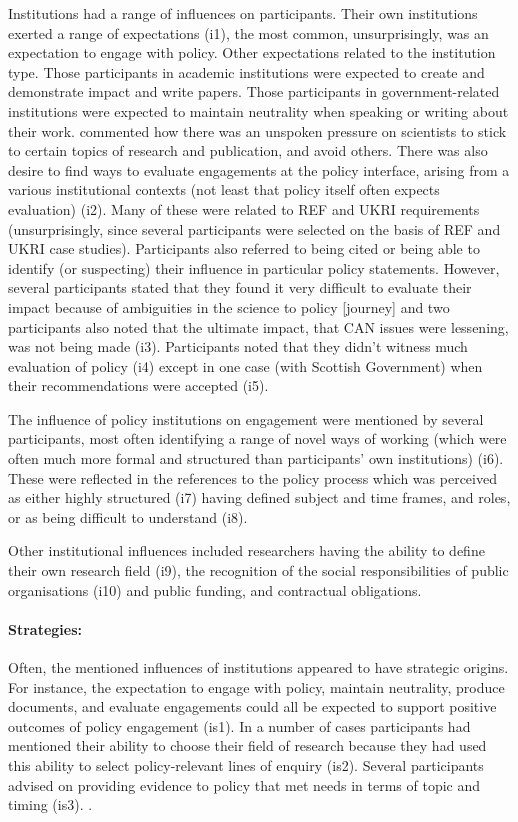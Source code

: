 Institutions had a range of influences on participants. Their own institutions exerted a range of expectations (i1), the most common, unsurprisingly, was an expectation to engage with policy. Other expectations related to the institution type. Those participants in academic institutions were expected to create and demonstrate impact and write papers. Those participants in government-related institutions were expected to maintain neutrality when speaking or writing about their work.  commented how there was an unspoken pressure on scientists to stick to certain topics of research and publication, and avoid others. There was also desire to find ways to evaluate engagements at the policy interface, arising from a various institutional contexts (not least that policy itself often expects evaluation) (i2). Many of these were related to REF and UKRI requirements (unsurprisingly, since several participants were selected on the basis of REF and UKRI case studies). Participants also referred to being cited or being able to identify (or suspecting) their influence in particular policy statements. However, several participants stated that they found it very difficult to evaluate their impact because of ambiguities in the science to policy [journey] and two participants also noted that the ultimate impact, that CAN issues were lessening, was not being made (i3). Participants noted that they didn't witness much evaluation of policy (i4) except in one case (with Scottish Government) when their recommendations were accepted (i5).

The influence of policy institutions on engagement were mentioned by several participants, most often identifying a range of novel ways of working (which were often much more formal and structured than participants' own institutions) (i6). These were reflected in the references to the policy process which was perceived as either highly structured (i7) having defined subject and time frames, and roles, or as being difficult to understand (i8).

Other institutional influences included researchers having the ability to define their own research field (i9), the recognition of the social responsibilities of public organisations (i10) and public funding, and contractual obligations.

\paragraph{Strategies:} Often, the mentioned influences of institutions appeared to have strategic origins. For instance, the expectation to engage with policy, maintain neutrality, produce documents, and evaluate engagements could all be expected to support positive outcomes of policy engagement (is1). In a number of cases participants had mentioned their ability to choose their field of research because they had used this ability to select policy-relevant lines of enquiry (is2). Several participants advised on providing evidence to policy that met needs in terms of topic and timing (is3). .

